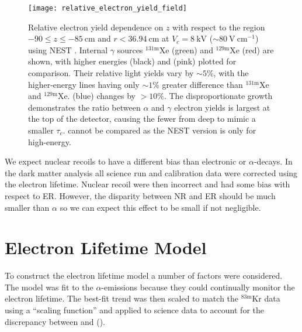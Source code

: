 \begin{figure}
\centering
\texttt{[image: relative\_electron\_yield\_field]}
\caption[Relative electron yield dependence on $z$ with respect to the region $-90 \leq z \leq -85\ \mathrm{cm}$ and
$r < 36.94\ \mathrm{cm}$ at $V_c = 8\ \mathrm{kV}$ (${\sim}80\ \mathrm{V\ cm^{-1}}$) using NEST .  In addition to
, internal $\gamma$ sources $\mathrm{^{131m}Xe}$ and $\mathrm{^{129m}Xe}$
are shown, with higher energies  and  plotted for comparison.]{Relative electron yield dependence on $z$ with
respect to the region $-90 \leq z \leq -85\ \mathrm{cm}$ and
$r < 36.94\ \mathrm{cm}$ at $V_c = 8\ \mathrm{kV}$ (${\sim}80\ \mathrm{V\ cm^{-1}}$) using NEST .  Internal
$\gamma$ sources $\mathrm{^{131m}Xe}$ (green) and
$\mathrm{^{129m}Xe}$
(red) are shown, with higher energies  (black) and  (pink) plotted for comparison. Their relative
light yields vary by ${\sim} 5\%$, with the higher-energy lines having only ${\sim} 1\%$ greater difference than $\mathrm{^{131m}Xe}$ and
$\mathrm{^{129m}Xe}$.   (blue) changes by $> 10\%$.  The disproportionate growth demonstrates the ratio between
$\alpha$ and $\gamma$ electron yields is largest at the top of the detector, causing the fewer \electron from deep \alphadecays to
mimic a smaller $\tau_e$.  \metakr cannot be compared as the NEST version is only for high-energy.}
\label{fig:electron_lifetimes_rn222_vs_kr83m_field_z}
\end{figure}

We expect nuclear recoils to have a different bias than electronic or $\alpha$-decays.  In the dark matter analysis all
science run and calibration data were corrected using the \metakr electron lifetime.  Nuclear recoil \cstwob were then incorrect and had
some bias with respect to ER.  However, the disparity between NR and ER should be much smaller than $\alpha$ so we can expect this effect
to be small if not negligible.



\section{Electron Lifetime Model}
\label{sec:electron_lifetime_model}
To construct the electron lifetime model a number of factors were considered.  The model was fit to the  $\alpha$-emissions
because they could continually monitor the electron lifetime.  The best-fit trend was then scaled to match the $\mathrm{^{83m}Kr}$ data
using a ``scaling function'' and applied to science data to account for the discrepancy between \alphadecays and \metakr
().

